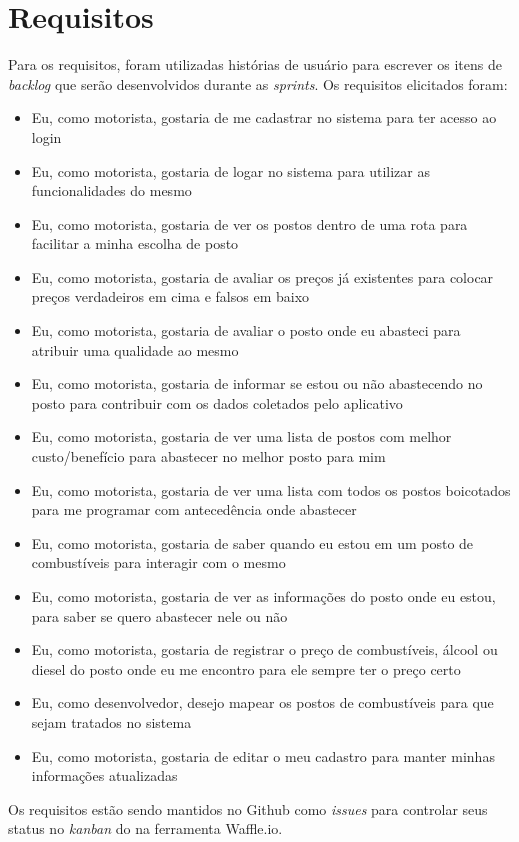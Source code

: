 \section{Requisitos}

Para os requisitos, foram utilizadas histórias de usuário para escrever os itens de \textit{backlog} que serão desenvolvidos durante as \textit{sprints}. Os requisitos elicitados foram:
\begin{itemize}
    \item Eu, como motorista, gostaria de me cadastrar no sistema para ter acesso ao login
    \item Eu, como motorista, gostaria de logar no sistema para utilizar as funcionalidades do mesmo
    \item Eu, como motorista, gostaria de ver os postos dentro de uma rota para facilitar a minha escolha de posto
    \item Eu, como motorista, gostaria de avaliar os preços já existentes para colocar preços verdadeiros em cima e falsos em baixo
    \item Eu, como motorista, gostaria de avaliar o posto onde eu abasteci para atribuir uma qualidade ao mesmo
    \item Eu, como motorista, gostaria de informar se estou ou não abastecendo no posto para contribuir com os dados coletados pelo aplicativo
    \item Eu, como motorista, gostaria de ver uma lista de postos com melhor custo/benefício para abastecer no melhor posto para mim
    \item Eu, como motorista, gostaria de ver uma lista com todos os postos boicotados para me programar com antecedência onde abastecer
    \item Eu, como motorista, gostaria de saber quando eu estou em um posto de combustíveis para interagir com o mesmo
    \item Eu, como motorista, gostaria de ver as informações do posto onde eu estou, para saber se quero abastecer nele ou não
    \item Eu, como motorista, gostaria de registrar o preço de combustíveis, álcool ou diesel do posto onde eu me encontro para ele sempre ter o preço certo
    \item Eu, como desenvolvedor, desejo mapear os postos de combustíveis para que sejam tratados no sistema
    \item Eu, como motorista, gostaria de editar o meu cadastro para manter minhas informações atualizadas
\end{itemize}
Os requisitos estão sendo mantidos no Github como \textit{issues} para controlar seus status no \textit{kanban} do  na ferramenta Waffle.io.
